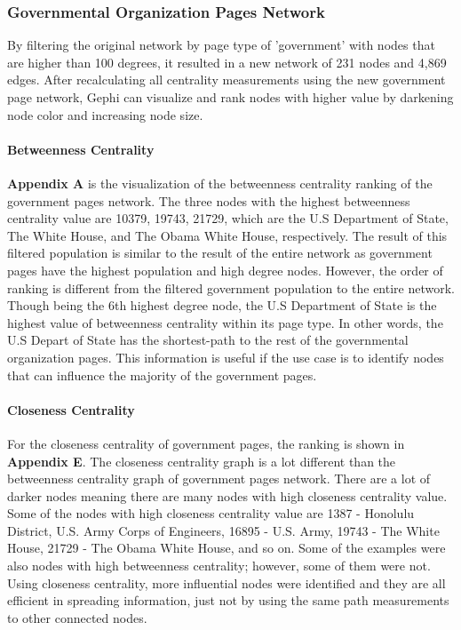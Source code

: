 \documentclass[11pt,twocolumn]{article}
\begin{document}
\subsubsection{Governmental Organization Pages Network}
By filtering the original network by page type of 'government' with nodes that are higher than 100 degrees, it resulted in a new network of 231 nodes and 4,869 edges. After recalculating all centrality measurements using the new government page network, Gephi can visualize and rank nodes with higher value by darkening node color and increasing node size. 

\paragraph{Betweenness Centrality}
\textbf{Appendix A} is the visualization of the betweenness centrality ranking of the government pages network. The three nodes with the highest betweenness centrality value are 10379, 19743, 21729, which are the U.S Department of State, The White House, and The Obama White House, respectively. The result of this filtered population is similar to the result of the entire network as government pages have the highest population and high degree nodes. However, the order of ranking is different from the filtered government population to the entire network. Though being the 6th highest degree node, the U.S Department of State is the highest value of betweenness centrality within its page type. In other words, the U.S Depart of State has the shortest-path to the rest of the governmental organization pages. This information is useful if the use case is to identify nodes that can influence the majority of the government pages. 

\paragraph{Closeness Centrality}
For the closeness centrality of government pages, the ranking is shown in \textbf{Appendix E}. The closeness centrality graph is a lot different than the betweenness centrality graph of government pages network. There are a lot of darker nodes meaning there are many nodes with high closeness centrality value. Some of the nodes with high closeness centrality value are 1387 - Honolulu District, U.S. Army Corps of Engineers, 16895 - U.S. Army, 19743 - The White House, 21729 - The Obama White House, and so on. Some of the examples were also nodes with high betweenness centrality; however, some of them were not. Using closeness centrality, more influential nodes were identified and they are all efficient in spreading information, just not by using the same path measurements to other connected nodes.
\end{document}
